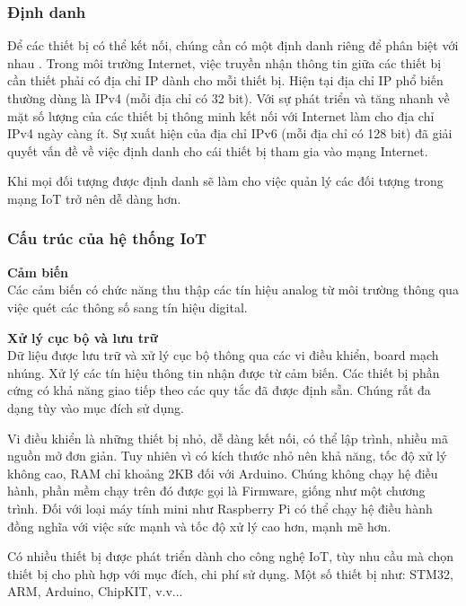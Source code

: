 \documentclass[a4paper,12pt,oneside]{article}
\begin{document}
\subsubsection{Định danh}

\noindent Để các thiết bị có thể kết nối, chúng cần có một định danh riêng để phân biệt với nhau \cite{iot}. Trong môi trường Internet, việc truyền nhận thông tin giữa các thiết bị cần thiết phải có địa chỉ IP dành cho mỗi thiết bị. Hiện tại địa chỉ IP phổ biến thường dùng là IPv4 (mỗi địa chỉ có 32 bit). Với sự phát triển và tăng nhanh về mặt số lượng của các thiết bị thông minh kết nối với Internet làm cho địa chỉ IPv4 ngày càng ít. Sự xuất hiện của địa chỉ IPv6 (mỗi địa chỉ có 128 bit) đã giải quyết vấn đề về việc định danh cho cái thiết bị tham gia vào mạng Internet. 

\noindent Khi mọi đối tượng được định danh sẽ làm cho việc quản lý các đối tượng trong mạng IoT trở nên dễ dàng hơn.

\subsubsection{Cấu trúc của hệ thống IoT \cite{cautruciot}}

\noindent \textbf{Cảm biến}\\
\noindent Các cảm biến có chức năng thu thập các tín hiệu analog từ môi trường thông qua việc quét các thông số sang tín hiệu digital.

\noindent \textbf{Xử lý cục bộ và lưu trữ}\\
\noindent Dữ liệu được lưu trữ và xử lý cục bộ thông qua các vi điều khiển, board mạch nhúng. Xử lý các tín hiệu thông tin nhận được từ cảm biến. Các thiết bị phần cứng có khả năng giao tiếp theo các quy tắc đã được định sẵn. Chúng rất đa dạng tùy vào mục đích sử dụng.

\noindent Vi điều khiển là những thiết bị nhỏ, dễ dàng kết nối, có thể lập trình, nhiều mã nguồn mở đơn giản. Tuy nhiên vì có kích thước nhỏ nên khả năng, tốc độ xử lý không cao, RAM chỉ khoảng 2KB đối với Arduino. Chúng không chạy hệ điều hành, phần mềm chạy trên đó được gọi là Firmware, giống như một chương trình. Đối với loại máy tính mini như Raspberry Pi có thể chạy hệ điều hành đồng nghĩa với việc sức mạnh và tốc độ xử lý cao hơn, mạnh mẽ hơn.

\noindent Có nhiều thiết bị được phát triển dành cho công nghệ IoT, tùy nhu cầu mà chọn thiết bị cho phù hợp với mục đích, chi phí sử dụng. Một số thiết bị như: STM32, ARM, Arduino, ChipKIT, v.v...
\end{document}
